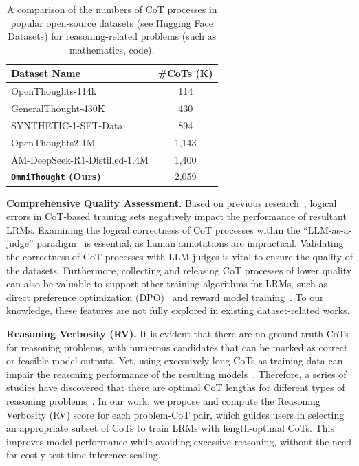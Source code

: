 \documentclass{article}
\begin{document}
\begin{table}
    \centering
    \caption{A comparison of the numbers of CoT processes in popular open-source datasets (see Hugging Face Datasets) for reasoning-related problems (such as mathematics, code).}
    \begin{small}
    \begin{tabular}{l|c}
        \hline
        \textbf{Dataset Name} & \textbf{\#CoTs (K)} \\
        \hline
        OpenThoughts-114k & 114 \\
        GeneralThought-430K & 430 \\
        SYNTHETIC-1-SFT-Data & 894 \\
        OpenThoughts2-1M & 1,143 \\
        AM-DeepSeek-R1-Distilled-1.4M & 1,400 \\
        \hline
        \bf\texttt{OmniThought} (Ours) & 2,059 \\
        \hline
    \end{tabular}
    \end{small}
    \label{tab:num}
\end{table}


\textbf{Comprehensive Quality Assessment.} Based on previous research~\cite{DBLP:conf/acl/JacoviBBHHT0AG24}, logical errors in CoT-based training sets negatively impact the performance of resultant LRMs. Examining the logical correctness of CoT processes within the ``LLM-as-a-judge'' paradigm~\cite{DBLP:journals/corr/abs-2411-15594} is essential, as human annotations are impractical. Validating the correctness of CoT processes with LLM judges is vital to ensure the quality of the datasets. Furthermore, collecting and releasing CoT processes of lower quality can also be valuable to support other training algorithms for LRMs, such as direct preference optimization (DPO)~\cite{DBLP:conf/nips/RafailovSMMEF23} and reward model training~\cite{DBLP:conf/nips/Ouyang0JAWMZASR22}. To our knowledge, these features are not fully explored in existing dataset-related works.

\textbf{Reasoning Verbosity (RV).} It is evident that there are no ground-truth CoTs for reasoning problems, with numerous candidates that can be marked as correct or feasible model outputs. Yet, using excessively long CoTs as training data can impair the reasoning performance of the resulting models~\cite{DBLP:journals/corr/abs-2502-18080,DBLP:journals/corr/abs-2501-12570}. Therefore, a series of studies have discovered that there are optimal CoT lengths for different types of reasoning problems~\cite{DBLP:journals/corr/abs-2502-18080}. In our work, we propose and compute the Reasoning Verbosity (RV) score for each problem-CoT pair, which guides users in selecting an appropriate subset of CoTs to train LRMs with length-optimal CoTs. This improves model performance while avoiding excessive reasoning, without the need for costly test-time inference scaling.
\end{document}
